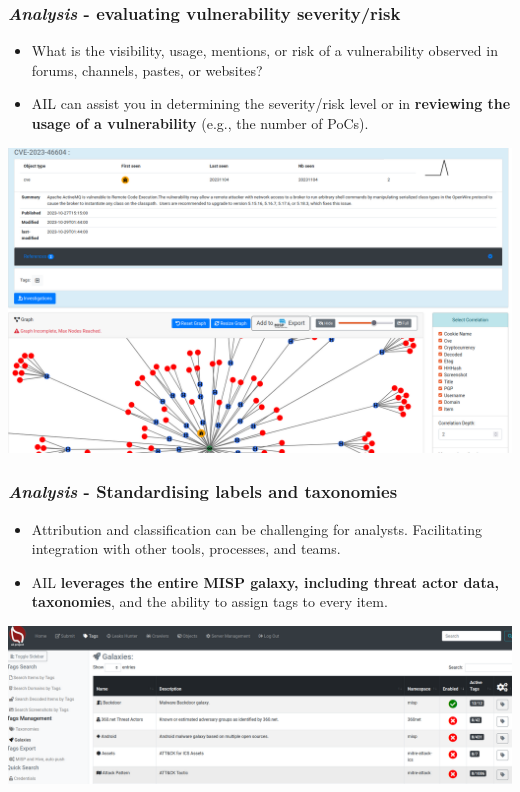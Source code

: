 \documentclass{beamer}
\begin{document}
\begin{frame}
    \frametitle{{\it Analysis} - evaluating vulnerability severity/risk}
    \begin{itemize}
         \item What is the visibility, usage, mentions, or risk of a vulnerability observed in forums, channels, pastes, or websites?
         \item AIL can assist you in determining the severity/risk level or in {\bf reviewing the usage of a vulnerability} (e.g., the number of PoCs).
    \end{itemize}
    \begin{center}
         \includegraphics[scale=0.15]{images/ail-CVE-example.png}
    \end{center}
\end{frame}

\begin{frame}
    \frametitle{{\it Analysis} - Standardising labels and taxonomies}
	\begin{itemize}
		\item Attribution and classification can be challenging for analysts. Facilitating integration with other tools, processes, and teams.
		\item AIL {\bf leverages the entire MISP galaxy, including threat actor data, taxonomies}, and the ability to assign tags to every item.
	\end{itemize}
    \begin{center}
        \includegraphics[scale=0.15]{images/ail-galaxy.png}
    \end{center}
\end{frame}
\end{document}
